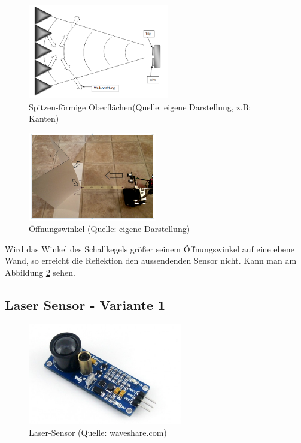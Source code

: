 \begin{figure}[!h]  %
	\centering\includegraphics[width=0.55\textwidth]{images/Bild-6.png}
	\caption{Spitzen-förmige Oberflächen\newline(Quelle: eigene Darstellung, z.B: Kanten)}
	\label{bild_6}
\end{figure}

\begin{figure}[!h]  %
	\centering\includegraphics[width=0.5\textwidth]{images/Bild-7.png}
	\caption{Öffnungswinkel (Quelle: eigene Darstellung)}
	\label{bild_7} %
\end{figure}

Wird das Winkel des Schallkegels größer seinem Öffnungswinkel auf eine ebene Wand, so erreicht die Reflektion den aussendenden Sensor nicht. Kann man am Abbildung \ref{bild_7} sehen.

\subsection{Laser Sensor - Variante 1}

\begin{figure}[!h]  %
	\centering\includegraphics[width=0.6\textwidth]{images/laser-sensor.png}
	\caption{Laser-Sensor (Quelle: waveshare.com)}
	\label{laser-sensor} %
\end{figure}

